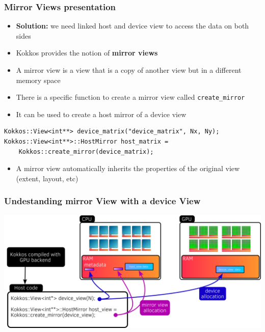 \documentclass[aspectratio=169]{beamer}
\begin{document}

\begin{frame}[fragile]
    \frametitle{Mirror Views presentation}

\begin{itemize}
    \item \textbf{Solution:} we need linked host and device view to access the data on both sides
    \item Kokkos provides the notion of \textbf{mirror views}
    \item A mirror view is a view that is a copy of another view but in a different memory space
    \item There is a specific function to create a mirror view called \texttt{create\_mirror}
    \item It can be used to create a host mirror of a device view
\end{itemize}

\begin{verbatim}
Kokkos::View<int**> device_matrix("device_matrix", Nx, Ny);
Kokkos::View<int**>::HostMirror host_matrix = 
    Kokkos::create_mirror(device_matrix);
\end{verbatim}

\begin{itemize}
\item A mirror view automatically inherits the properties of the original view (extent, layout, etc)
\end{itemize}

\end{frame}


\begin{frame}[fragile]
    \frametitle{Undestanding mirror View with a device View}

\begin{center}
    \includegraphics[width=\textwidth]{../../images/device_mirror_view.png}
\end{center}

\end{frame}
\end{document}
